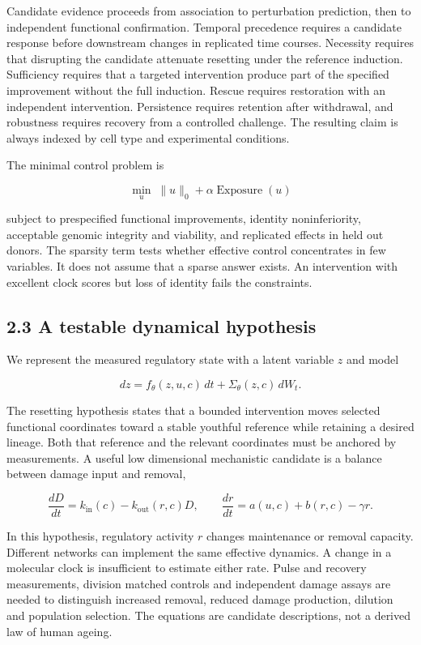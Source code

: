 \documentclass[
  11pt,
  letterpaper,
]{article}
\begin{document}
Candidate evidence proceeds from association to perturbation prediction,
then to independent functional confirmation. Temporal precedence
requires a candidate response before downstream changes in replicated
time courses. Necessity requires that disrupting the candidate attenuate
resetting under the reference induction. Sufficiency requires that a
targeted intervention produce part of the specified improvement without
the full induction. Rescue requires restoration with an independent
intervention. Persistence requires retention after withdrawal, and
robustness requires recovery from a controlled challenge. The resulting
claim is always indexed by cell type and experimental conditions.

The minimal control problem is

\[
\min_{u}\;\|u\|_0+\alpha\operatorname{Exposure}(u)
\]

subject to prespecified functional improvements, identity
noninferiority, acceptable genomic integrity and viability, and
replicated effects in held out donors. The sparsity term tests whether
effective control concentrates in few variables. It does not assume that
a sparse answer exists. An intervention with excellent clock scores but
loss of identity fails the constraints.

\hypertarget{a-testable-dynamical-hypothesis}{%
\subsection{2.3 A testable dynamical
hypothesis}\label{a-testable-dynamical-hypothesis}}

We represent the measured regulatory state with a latent variable \(z\)
and model

\[
dz=f_\theta(z,u,c)\,dt+\Sigma_\theta(z,c)\,dW_t.
\]

The resetting hypothesis states that a bounded intervention moves
selected functional coordinates toward a stable youthful reference while
retaining a desired lineage. Both that reference and the relevant
coordinates must be anchored by measurements. A useful low dimensional
mechanistic candidate is a balance between damage input and removal,

\[
\frac{dD}{dt}=k_{\mathrm{in}}(c)-k_{\mathrm{out}}(r,c)D,
\qquad
\frac{dr}{dt}=a(u,c)+b(r,c)-\gamma r.
\]

In this hypothesis, regulatory activity \(r\) changes maintenance or
removal capacity. Different networks can implement the same effective
dynamics. A change in a molecular clock is insufficient to estimate
either rate. Pulse and recovery measurements, division matched controls
and independent damage assays are needed to distinguish increased
removal, reduced damage production, dilution and population selection.
The equations are candidate descriptions, not a derived law of human
ageing.
\end{document}
